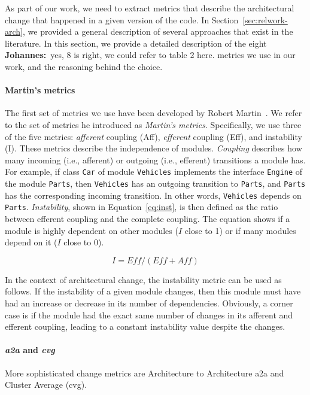 \documentclass[sigplan, anonymous, review]{acmart}
\newcommand{\jk}[1]{{\color{violet}\textbf{Johannes:}~#1}}
\begin{document}
As part of our work, we need to extract metrics that describe the architectural change that happened in a given version of the code. 
In Section~\ref{sec:relwork-arch}, we provided a general description of several approaches that exist in the literature.
In this section, we provide a detailed description of the eight \jk{yes, 8 is right, we could refer to table 2 here.} metrics we use in our work, and the reasoning behind the choice.


\paragraph{Martin's metrics} 
The first set of metrics we use have been developed by Robert Martin~\cite{martinsMetrics}.
We refer to the set of metrics he introduced as \textit{Martin's metrics}.
Specifically, we use three of the five metrics: \textit{afferent} coupling (Aff), \textit{efferent} coupling (Eff), and instability (I).
These metrics describe the independence of modules. 
\textit{Coupling} describes how many incoming (i.e., afferent) or outgoing (i.e., efferent) transitions a module has. 
For example, if class \texttt{Car} of module \texttt{Vehicles} implements the interface \texttt{Engine} of the module \texttt{Parts}, then \texttt{Vehicles} has an outgoing transition to \texttt{Parts}, and \texttt{Parts} has the corresponding incoming transition. 
In other words, \texttt{Vehicles} depends on \texttt{Parts}.
\textit{Instability}, shown in Equation~\ref{eq:inst}, is then defined as the ratio between efferent coupling and the complete coupling.
The equation shows if a module is highly dependent on other modules ($I$ close to 1) or if many modules depend on it ($I$ close to 0).

\begin{equation} \label{eq:inst}
I = \textit{Eff} / (\textit{Eff} + \textit{Aff})
\end{equation}

In the context of architectural change, the instability metric can be used as follows. If the instability of a given module changes, then this module must have had an increase or decrease in its number of dependencies. 
Obviously, a corner case is if the module had the exact same number of changes in its afferent and efferent coupling, leading to a constant instability value despite the changes.

\paragraph{\textit{a2a} and \textit{cvg}} More sophisticated change metrics are Architecture to Architecture {a2a} and Cluster Average (cvg). 
\end{document}
